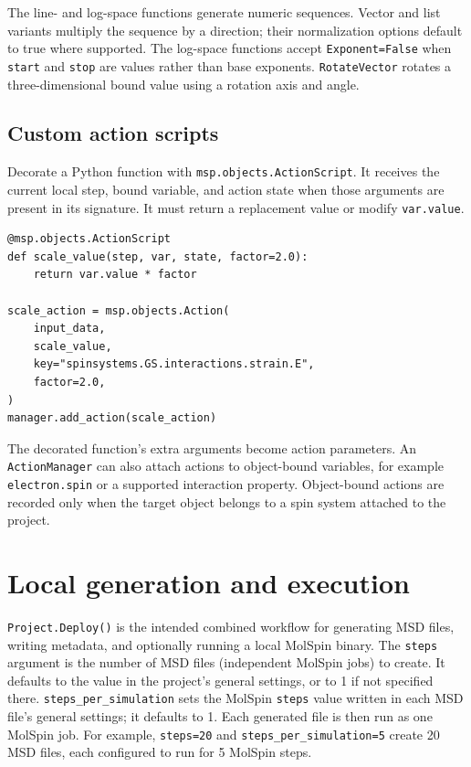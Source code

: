 \documentclass[11pt,a4paper]{article}
\begin{document}
The line- and log-space functions generate numeric sequences. Vector and
list variants multiply the sequence by a direction; their normalization
options default to true where supported. The log-space functions accept
\texttt{Exponent=False} when \texttt{start} and \texttt{stop} are values
rather than base exponents. \texttt{RotateVector} rotates a three-dimensional
bound value using a rotation axis and angle.

\subsection{Custom action scripts}

Decorate a Python function with \texttt{msp.objects.ActionScript}. It receives
the current local step, bound variable, and action state when those arguments
are present in its signature. It must return a replacement value or modify
\texttt{var.value}.

\begin{lstlisting}
@msp.objects.ActionScript
def scale_value(step, var, state, factor=2.0):
    return var.value * factor

scale_action = msp.objects.Action(
    input_data,
    scale_value,
    key="spinsystems.GS.interactions.strain.E",
    factor=2.0,
)
manager.add_action(scale_action)
\end{lstlisting}

The decorated function's extra arguments become action parameters. An
\texttt{ActionManager} can also attach actions to object-bound variables,
for example \texttt{electron.spin} or a supported interaction property.
Object-bound actions are recorded only when the target object belongs to a
spin system attached to the project.

\section{Local generation and execution}

\texttt{Project.Deploy()} is the intended combined workflow for generating
MSD files, writing metadata, and optionally running a local MolSpin binary.
The \texttt{steps} argument is the number of MSD files (independent MolSpin
jobs) to create. It defaults to the value in the project's general settings,
or to 1 if not specified there. \texttt{steps\_per\_simulation} sets the
MolSpin \texttt{steps} value written in each MSD file's general settings; it
defaults to 1. Each generated file is then run as one MolSpin job. For
example, \texttt{steps=20} and \texttt{steps\_per\_simulation=5} create 20
MSD files, each configured to run for 5 MolSpin steps.
\end{document}
